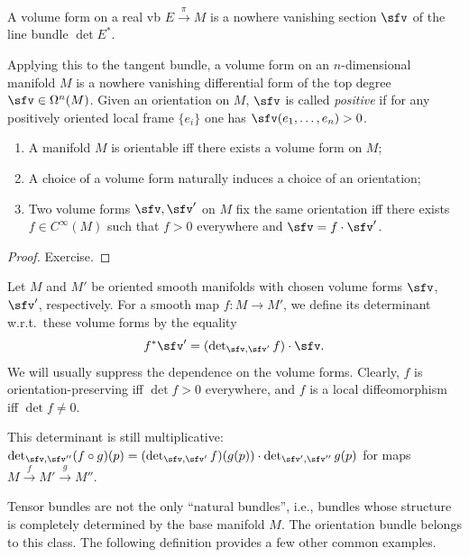 \begin{defn}
    A volume form on a real \gls{vb} $E\overset{\pi}{\to} M$ is a nowhere vanishing section $\sfv$ of the line bundle $\det E^\ast$. 

    Applying this to the tangent bundle, a volume form on an $n$-dimensional manifold $M$ is a nowhere vanishing differential form of the top degree $\sfv\in \Omega^n(M)$. Given an orientation on $M$, $\sfv$ is called \emph{positive} if for any positively oriented local frame $\{e_i\}$ one has $\sfv(e_1,\ldots,e_n)>0$.
\end{defn}

\begin{prop}
\begin{enumerate}
    \item A manifold $M$ is orientable iff there exists a volume form on $M$;
    \item A choice of a volume form naturally induces a choice of an orientation;
    \item Two volume forms $\sfv,\sfv'$ on $M$ fix the same orientation iff there exists $f\in C^\infty(M)$ such that $f>0$ everywhere and $\sfv=f\cdot \sfv'$. 
\end{enumerate}
\end{prop}
\begin{proof}
Exercise.
\end{proof}


\begin{defn}
    Let $M$ and $M'$ be oriented smooth manifolds with chosen volume forms $\sfv$, $\sfv'$, respectively. For a smooth map $f:M\to M'$, we define its determinant w.r.t.\ these volume forms by the equality
    \[f^\ast \sfv'=\left(\det\nolimits_{\sfv,\sfv'}f\right)\cdot \sfv.\]
    We will usually suppress the dependence on the volume forms. Clearly, $f$ is orientation-preserving iff $\det f>0$ everywhere, and $f$ is a local diffeomorphism iff $\det f\neq 0$.

    This determinant is still multiplicative: $\det\nolimits_{\sfv,\sfv''}(f\circ g)(p)=(\det\nolimits_{\sfv,\sfv'} f)(g(p))\cdot \det\nolimits_{\sfv',\sfv''} g(p)$ for maps $M\overset{f}{\to}M'\overset{g}{\to}M''$.
\end{defn}

Tensor bundles are not the only ``natural bundles'', i.e., bundles whose structure is completely determined by the base manifold $M$. The orientation bundle belongs to this class. The following definition provides a few other common examples.

